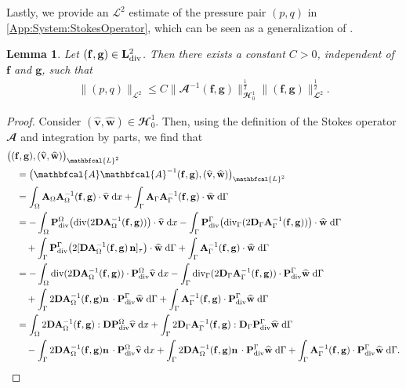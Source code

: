\documentclass[10pt,reqno]{amsart}
\newtheorem{lemma}[theorem]{Lemma}
\theoremstyle{remark}
\numberwithin{equation}{section}
\newcommand{\norm}[1]{\| #1 \|}
\newcommand{\bigscp}[2]{\big( #1 , #2 \big)}
\newcommand{\n}{\mathbf{n}}
\newcommand{\bv}{\mathbf{v}}
\newcommand{\bw}{\mathbf{w}}
\newcommand{\ww}{\widehat{\bw}}
\newcommand{\wv}{\widehat{\bv}}
\newcommand{\D}{\mathbf{D}}
\newcommand{\f}{\mathbf{f}}
\newcommand{\g}{\mathbf{g}}
\newcommand{\A}{\mathbf{A}}
\newcommand{\Dg}{\mathbf{D}_\Gamma}
\newcommand{\intO}{\int_\Omega}
\newcommand{\intG}{\int_\Gamma}
\newcommand{\dx}{\;\mathrm{d}x}
\newcommand{\dG}{\;\mathrm d\Ga}
\newcommand{\Div}{\textnormal{div}}
\newcommand{\Divg}{\textnormal{div}_\Ga}
\newcommand{\Om}{\Omega}
\newcommand{\Ga}{\Gamma}
\begin{document}
Lastly, we provide an $\mathcal{L}^2$ estimate of the pressure pair $(p,q)$ in \eqref{App:System:StokesOperator}, which can be seen as a generalization of \cite[Lemma~B.2]{Giorgini2019}.
\begin{lemma}
    Let $(\f,\g)\in\mathbf{L}^2_\Div$. Then there exists a constant $C > 0$, independent of $\f$ and $\g$, such that
    \begin{align}\label{App:Est:Pressure}
        \norm{(p,q)}_{\mathcal{L}^2} \leq C\norm{\mathbfcal{A}^{-1}(\f,\g)}_{\mathbfcal{H}^1_{0}}^{\frac12}\norm{(\f,\g)}_{\mathbfcal{L}^2}^{\frac12}.
    \end{align}
\end{lemma}

\begin{proof}
    Consider $(\wv,\ww)\in\mathbfcal{H}^1_0$. Then, using the definition of the Stokes operator $\mathbfcal{A}$ and integration by parts, we find that
    \begin{align*}
        &\bigscp{(\f,\g)}{(\wv,\ww)}_{\mathbfcal{L}^2} \\
        &\quad = \bigscp{\mathbfcal{A}\mathbfcal{A}^{-1}(\f,\g)}{(\wv,\ww)}_{\mathbfcal{L}^2} \\
        &\quad = \intO \mathbf{A}_\Om\mathbf{A}_\Om^{-1}(\f,\g)\cdot\wv\dx + \intG \mathbf{A}_\Ga\mathbf{A}_\Ga^{-1}(\f,\g)\cdot\ww\dG \\
        &\quad = - \intO \mathbf{P}_\Div^\Om\big(\Div(2\D\mathbf{A}_\Om^{-1}(\f,\g))\big)\cdot\wv \dx - \intG \mathbf{P}_\Div^\Ga\big(\Divg(2\Dg\mathbf{A}_\Ga^{-1}(\f,\g))\big)\cdot\ww \dG \\
        &\qquad + \intG \mathbf{P}_\Div^\Ga\big(2[\D\mathbf{A}_\Om^{-1}(\f,\g)\,\n]_\tau\big)\cdot\ww\dG + \intG \mathbf{A}_\Ga^{-1}(\f,\g)\cdot\ww\dG \\
        &\quad = - \intO \Div(2\D\A_\Om^{-1}(\f,\g))\cdot\mathbf{P}_\Div^\Om\wv\dx - \intG \Divg(2\Dg\A_\Ga^{-1}(\f,\g))\cdot\mathbf{P}_\Div^\Ga\ww\dG \\
        &\qquad + \intG 2\D\mathbf{A}_\Om^{-1}(\f,\g)\n\,\cdot\mathbf{P}_\Div^\Ga\ww\dG + \intG \mathbf{A}_\Ga^{-1}(\f,\g)\cdot\mathbf{P}_\Div^\Ga\ww\dG \\
        &\quad = \intO 2\D\A_\Om^{-1}(\f,\g):\D\mathbf{P}_\Div^\Om\wv\dx + \intG 2\Dg\A_\Ga^{-1}(\f,\g):\Dg\mathbf{P}_\Div^\Ga\ww\dG \\
        &\qquad - \intG 2\D\A_\Om^{-1}(\f,\g)\n\,\cdot\mathbf{P}_\Div^\Om\wv\dx + \intG 2\D\A_\Om^{-1}(\f,\g)\n\,\cdot\mathbf{P}_\Div^\Ga\ww\dG + \intG \mathbf{A}_\Ga^{-1}(\f,\g)\cdot\mathbf{P}_\Div^\Ga\ww\dG.

\end{align*}
\end{proof}
\end{document}
